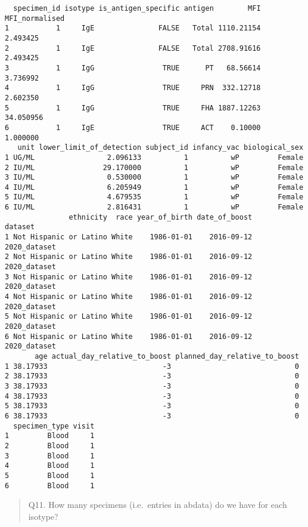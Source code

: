 \documentclass[
  letterpaper,
  DIV=11,
  numbers=noendperiod]{scrartcl}
\newenvironment{Shaded}{\begin{snugshade}}{\end{snugshade}}
\newcommand{\FunctionTok}[1]{\textcolor[rgb]{0.28,0.35,0.67}{#1}}
\newcommand{\NormalTok}[1]{\textcolor[rgb]{0.00,0.23,0.31}{#1}}
\newcommand{\SpecialCharTok}[1]{\textcolor[rgb]{0.37,0.37,0.37}{#1}}
\begin{document}
\begin{verbatim}
  specimen_id isotype is_antigen_specific antigen        MFI MFI_normalised
1           1     IgE               FALSE   Total 1110.21154       2.493425
2           1     IgE               FALSE   Total 2708.91616       2.493425
3           1     IgG                TRUE      PT   68.56614       3.736992
4           1     IgG                TRUE     PRN  332.12718       2.602350
5           1     IgG                TRUE     FHA 1887.12263      34.050956
6           1     IgE                TRUE     ACT    0.10000       1.000000
   unit lower_limit_of_detection subject_id infancy_vac biological_sex
1 UG/ML                 2.096133          1          wP         Female
2 IU/ML                29.170000          1          wP         Female
3 IU/ML                 0.530000          1          wP         Female
4 IU/ML                 6.205949          1          wP         Female
5 IU/ML                 4.679535          1          wP         Female
6 IU/ML                 2.816431          1          wP         Female
               ethnicity  race year_of_birth date_of_boost      dataset
1 Not Hispanic or Latino White    1986-01-01    2016-09-12 2020_dataset
2 Not Hispanic or Latino White    1986-01-01    2016-09-12 2020_dataset
3 Not Hispanic or Latino White    1986-01-01    2016-09-12 2020_dataset
4 Not Hispanic or Latino White    1986-01-01    2016-09-12 2020_dataset
5 Not Hispanic or Latino White    1986-01-01    2016-09-12 2020_dataset
6 Not Hispanic or Latino White    1986-01-01    2016-09-12 2020_dataset
       age actual_day_relative_to_boost planned_day_relative_to_boost
1 38.17933                           -3                             0
2 38.17933                           -3                             0
3 38.17933                           -3                             0
4 38.17933                           -3                             0
5 38.17933                           -3                             0
6 38.17933                           -3                             0
  specimen_type visit
1         Blood     1
2         Blood     1
3         Blood     1
4         Blood     1
5         Blood     1
6         Blood     1
\end{verbatim}

\begin{quote}
Q11. How many specimens (i.e.~entries in abdata) do we have for each
isotype?
\end{quote}

\begin{Shaded}
\end{Shaded}
\end{document}
